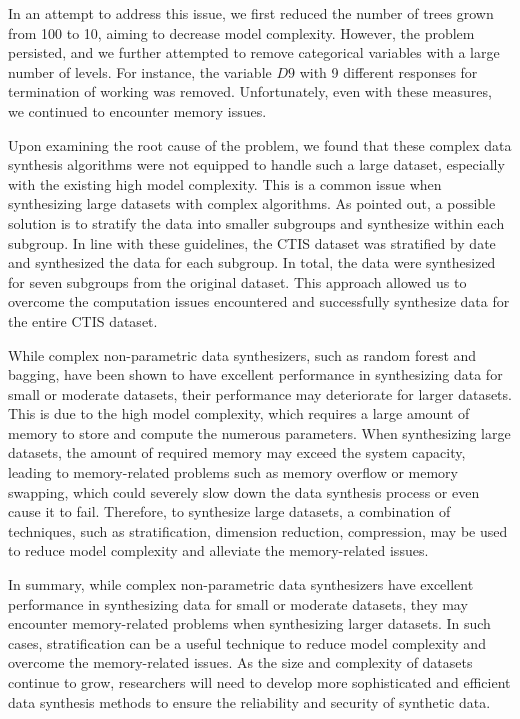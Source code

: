 In an attempt to address this issue, we first reduced the number of trees grown from 100 to 10, aiming to decrease model complexity. However, the problem persisted, and we further attempted to remove categorical variables with a large number of levels. For instance, the variable $D9$ with 9 different responses for termination of working was removed. Unfortunately, even with these measures, we continued to encounter memory issues.

Upon examining the root cause of the problem, we found that these complex data synthesis algorithms were not equipped to handle such a large dataset, especially with the existing high model complexity. This is a common issue when synthesizing large datasets with complex algorithms. As \citet{raab2017guidelines} pointed out, a possible solution is to stratify the data into smaller subgroups and synthesize within each subgroup. In line with these guidelines, the CTIS dataset was stratified by date and synthesized the data for each subgroup. In total, the data were synthesized for seven subgroups from the original dataset. This approach allowed us to overcome the computation issues encountered and successfully synthesize data for the entire CTIS dataset.

While complex non-parametric data synthesizers, such as random forest and bagging, have been shown to have excellent performance in synthesizing data for small or moderate datasets, their performance may deteriorate for larger datasets. This is due to the high model complexity, which requires a large amount of memory to store and compute the numerous parameters. When synthesizing large datasets, the amount of required memory may exceed the system capacity, leading to memory-related problems such as memory overflow or memory swapping, which could severely slow down the data synthesis process or even cause it to fail. Therefore, to synthesize large datasets, a combination of techniques, such as stratification, dimension reduction, compression, may be used to reduce model complexity and alleviate the memory-related issues.

In summary, while complex non-parametric data synthesizers have excellent performance in synthesizing data for small or moderate datasets, they may encounter memory-related problems when synthesizing larger datasets. In such cases, stratification can be a useful technique to reduce model complexity and overcome the memory-related issues. As the size and complexity of datasets continue to grow, researchers will need to develop more sophisticated and efficient data synthesis methods to ensure the reliability and security of synthetic data.






